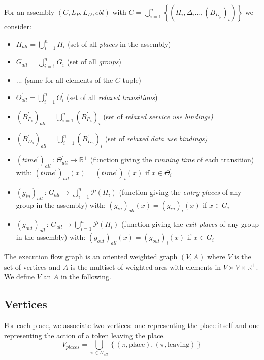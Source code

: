 For an assembly $\left(C,L_{P},L_{D},ebl\right)$ with $C=\bigcup_{i=1}^{n}\left\{ \left(\Pi_{i},\Delta_{i}\dots,\left(B_{D_{p}}\right)_{i}\right)\right\} $
we consider:
\begin{itemize}
\item $\Pi_{all}=\bigcup_{i=1}^{n}\Pi_{i}$ (set of all \emph{places} in
the assembly)
\item $G_{all}=\bigcup_{i=1}^{n}G_{i}$ (set of all \emph{groups})
\item ... (same for all elements of the $C$ tuple)
\item $\Theta_{all}^{\prime}=\bigcup_{i=1}^{n}\Theta_{i}^{\prime}$ (set
of all \emph{relaxed transitions})
\item $\left(B_{P_{u}}^{\prime}\right)_{all}=\bigcup_{i=1}^{n}\left(B_{P_{u}}^{\prime}\right)_{i}$
(set of\emph{ relaxed service use bindings)}
\item $\left(B_{D_{u}}^{\prime}\right)_{all}=\bigcup_{i=1}^{n}\left(B_{D_{u}}^{\prime}\right)_{i}$
(set of \emph{relaxed data use bindings)}
\item $\left(time^{\prime}\right)_{all}\,:\,\Theta_{all}^{\prime}\rightarrow\mathbb{R}^{+}$
(function giving the \emph{running time} of each transition) with:
$\left(time^{\prime}\right)_{all}\left(x\right)=\left(time^{\prime}\right)_{i}\left(x\right)$
if $x\in\Theta_{i}^{\prime}$ 
\item $\left(g_{in}\right)_{all}\,:\,G_{all}\rightarrow\bigcup_{i=1}^{n}\mathcal{P}\left(\Pi_{i}\right)$
(function giving the \emph{entry places} of any group in the assembly)
with: $\left(g_{in}\right)_{all}\left(x\right)=\left(g_{in}\right)_{i}\left(x\right)$
if $x\in G_{i}$ 
\item $\left(g_{out}\right)_{all}\,:\,G_{all}\rightarrow\bigcup_{i=1}^{n}\mathcal{P}\left(\Pi_{i}\right)$
(function giving the \emph{exit places }of any group in the assembly)
with: $\left(g_{out}\right)_{all}\left(x\right)=\left(g_{out}\right)_{i}\left(x\right)$
if $x\in G_{i}$ 
\end{itemize}
The execution flow graph is an oriented weighted graph \emph{$\left(V,A\right)$}
where $V$ is the set of vertices and $A$ is the multiset of weighted
arcs with elements in $V\times V\times\mathbb{R}^{+}$. We define
$V$ an $A$ in the following.

\subsection{Vertices}

For each place, we associate two vertices: one representing the place
itself and one representing the action of a token leaving the place.
\[
V_{places}=\bigcup_{\pi\in\Pi_{all}}\left\{ \left(\pi,\text{place}\right),\left(\pi,\text{leaving}\right)\right\} 
\]

